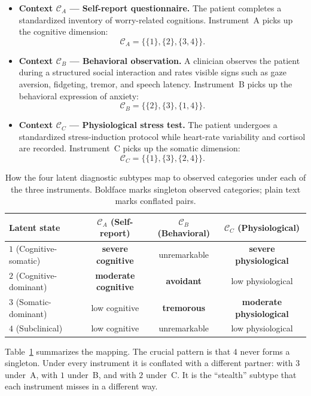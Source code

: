\documentclass{article}
\providecommand{\colrule}{\hline}
\begin{document}
\begin{itemize}
\item \textbf{Context $\mathcal{C}_A$ --- Self-report questionnaire.}
The patient completes a standardized inventory of worry-related
cognitions. Instrument~A picks up the cognitive dimension:
\[
\mathcal{C}_A=\{\{1\},\{2\},\{3,4\}\}.
\]

\item \textbf{Context $\mathcal{C}_B$ --- Behavioral observation.}
A clinician observes the patient during a structured social
interaction and rates visible signs such as gaze aversion, fidgeting,
tremor, and speech latency. Instrument~B picks up the behavioral
expression of anxiety:
\[
\mathcal{C}_B=\{\{2\},\{3\},\{1,4\}\}.
\]

\item \textbf{Context $\mathcal{C}_C$ --- Physiological stress test.}
The patient undergoes a standardized stress-induction protocol while
heart-rate variability and cortisol are recorded. Instrument~C picks
up the somatic dimension:
\[
\mathcal{C}_C=\{\{1\},\{3\},\{2,4\}\}.
\]
\end{itemize}

\begin{table}[htb]
\caption{\label{tab:clinical}How the four latent diagnostic
subtypes map to observed categories under each of the three
instruments. Boldface marks singleton observed categories; plain text
marks conflated pairs.}
\begin{center}
\begin{tabular}{lccc}
\colrule
Latent state & $\mathcal{C}_A$ (Self-report) &
  $\mathcal{C}_B$ (Behavioral) & $\mathcal{C}_C$ (Physiological)\\
\colrule
$1$ (Cognitive-somatic)  & \textbf{severe cognitive}  & unremarkable
  & \textbf{severe physiological}\\
$2$ (Cognitive-dominant)  & \textbf{moderate cognitive} & \textbf{avoidant}
  & low physiological\\
$3$ (Somatic-dominant)  & low cognitive  & \textbf{tremorous}
  & \textbf{moderate physiological}\\
$4$ (Subclinical) & low cognitive  & unremarkable
  & low physiological\\
\colrule
\end{tabular}
\end{center}
\end{table}

Table~\ref{tab:clinical} summarizes the mapping. The crucial pattern
is that $4$ never forms a singleton. Under every instrument it is
conflated with a different partner: with $3$ under~A, with $1$
under~B, and with $2$ under~C. It is the ``stealth'' subtype that
each instrument misses in a different way.
\end{document}
